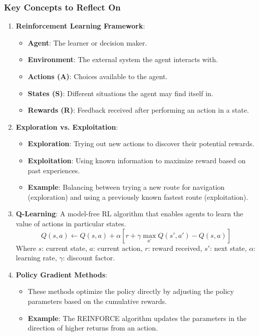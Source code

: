 \documentclass[aspectratio=169]{beamer}
\begin{document}
\begin{frame}[fragile]
    \frametitle{Key Concepts to Reflect On}
    \begin{enumerate}
        \item \textbf{Reinforcement Learning Framework}:
        \begin{itemize}
            \item \textbf{Agent}: The learner or decision maker.
            \item \textbf{Environment}: The external system the agent interacts with.
            \item \textbf{Actions (A)}: Choices available to the agent.
            \item \textbf{States (S)}: Different situations the agent may find itself in.
            \item \textbf{Rewards (R)}: Feedback received after performing an action in a state.
        \end{itemize}
        
        \item \textbf{Exploration vs. Exploitation}:
        \begin{itemize}
            \item \textbf{Exploration}: Trying out new actions to discover their potential rewards.
            \item \textbf{Exploitation}: Using known information to maximize reward based on past experiences.
            \item \textbf{Example}: Balancing between trying a new route for navigation (exploration) and using a previously known fastest route (exploitation).
        \end{itemize}
        
        \item \textbf{Q-Learning}:
        A model-free RL algorithm that enables agents to learn the value of actions in particular states.
        \begin{equation}
            Q(s, a) \leftarrow Q(s, a) + \alpha \left[ r + \gamma \max_{a'} Q(s', a') - Q(s, a) \right]
        \end{equation}
        Where \( s \): current state, \( a \): current action, \( r \): reward received, \( s' \): next state, \( \alpha \): learning rate, \( \gamma \): discount factor.
        
        \item \textbf{Policy Gradient Methods}:
        \begin{itemize}
            \item These methods optimize the policy directly by adjusting the policy parameters based on the cumulative rewards.
            \item \textbf{Example}: The REINFORCE algorithm updates the parameters in the direction of higher returns from an action.
        \end{itemize}
    \end{enumerate}
\end{frame}
\end{document}
